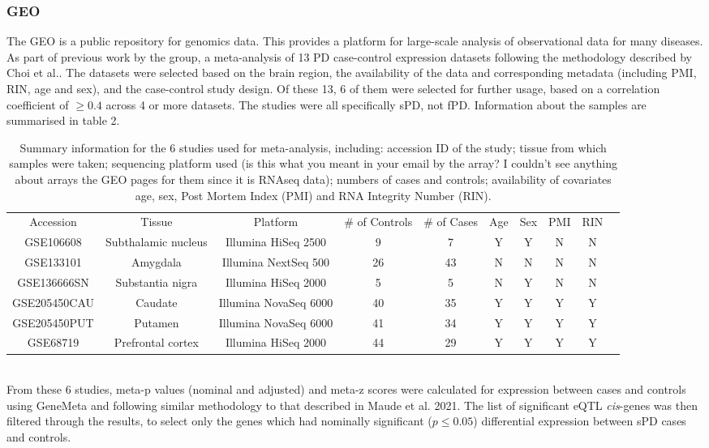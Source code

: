 \documentclass{article}
\begin{document}
\begin{landscape}
\subsubsection{GEO}

The GEO \cite{Barrett2012NCBISetsupdate} is a public repository for genomics data. This provides a platform for large-scale analysis of observational data for many diseases. As part of previous work by the group, a meta-analysis of 13 PD case-control expression datasets following the methodology described by Choi et al.\cite{Choi2003CombiningVariation}. The datasets were selected based on the brain region, the availability of the data and corresponding metadata (including PMI, RIN, age and sex), and the case-control study design. 
Of these 13, 6 of them were selected for further usage, based on a correlation coefficient of $\geq0.4$ across 4 or more datasets.
The studies were all specifically sPD, not fPD. Information about the samples are summarised in table 2.
\begin{table}[h]
    \hskip0cm
    \begin{tabular}{ |c|c|c|c|c|c|c|c|c|c| }
        \hline
        Accession & Tissue & Platform & \# of Controls & \# of Cases & Age & Sex & PMI & RIN \\
        GSE106608 & Subthalamic nucleus & Illumina HiSeq 2500 & 9 & 7 & Y & Y & N & N \\
        GSE133101 & Amygdala & 	Illumina NextSeq 500 & 26 & 43 & N & N & N & N \\
        GSE136666SN & Substantia nigra & Illumina HiSeq 2000 & 5 & 5 & N & Y & N & N \\
        GSE205450CAU & Caudate & Illumina NovaSeq 6000 & 40 & 35 & Y & Y & Y & Y \\
        GSE205450PUT & Putamen & Illumina NovaSeq 6000 & 41 & 34 & Y & Y & Y & Y \\
        GSE68719 & Prefrontal cortex & Illumina HiSeq 2000 & 44 & 29 & Y & Y & Y & Y \\
         \hline
    \end{tabular}
    \caption{Summary information for the 6 studies used for meta-analysis, including: accession ID of the study; tissue from which samples were taken; sequencing platform used (is this what you meant in your email by the array? I couldn't see anything about arrays the GEO pages for them since it is RNAseq data); numbers of cases and controls; availability of covariates age, sex, Post Mortem Index (PMI) and RNA Integrity Number (RIN).}
    \label{tab:my_label}
\end{table}
\end{landscape}
\\From these 6 studies, meta-p values (nominal and adjusted) and meta-z scores were calculated for expression between cases and controls using GeneMeta\cite{LusaL2024GeneMeta:Experiments.} and following similar methodology to that described in Maude et al. 2021\cite{Maude2021NewDiabetes.}. The list of significant eQTL \textit{cis}-genes was then filtered through the results, to select only the genes which had nominally significant ($p\leq0.05$) differential expression between sPD cases and controls.
\end{document}
